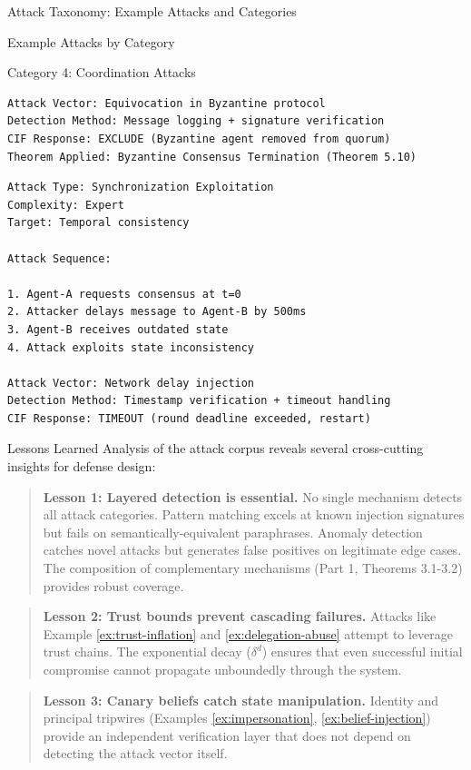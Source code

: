 \documentclass[
  ignorenonframetext,
]{beamer}
\begin{document}
\begin{frame}{Attack Taxonomy: Example Attacks and Categories}
\begin{block}{Example Attacks by Category}
\begin{block}{Category 4: Coordination Attacks}
\begin{example}
\begin{verbatim}
Attack Vector: Equivocation in Byzantine protocol
Detection Method: Message logging + signature verification
CIF Response: EXCLUDE (Byzantine agent removed from quorum)
Theorem Applied: Byzantine Consensus Termination (Theorem 5.10)
\end{verbatim}
\end{example}

\begin{example}
\label{ex:timing-attack}
\begin{verbatim}
Attack Type: Synchronization Exploitation
Complexity: Expert
Target: Temporal consistency

Attack Sequence:

1. Agent-A requests consensus at t=0
2. Attacker delays message to Agent-B by 500ms
3. Agent-B receives outdated state
4. Attack exploits state inconsistency

Attack Vector: Network delay injection
Detection Method: Timestamp verification + timeout handling
CIF Response: TIMEOUT (round deadline exceeded, restart)
\end{verbatim}
\end{example}
\end{block}
\end{block}

\begin{block}{Lessons Learned}
\protect{}\label{sec:lessons-learned}
Analysis of the attack corpus reveals several cross-cutting insights for
defense design:

\begin{quote}
\textbf{Lesson 1: Layered detection is essential.} No single mechanism
detects all attack categories. Pattern matching excels at known
injection signatures but fails on semantically-equivalent paraphrases.
Anomaly detection catches novel attacks but generates false positives on
legitimate edge cases. The composition of complementary mechanisms (Part
1, Theorems 3.1-3.2) provides robust coverage.
\end{quote}

\begin{quote}
\textbf{Lesson 2: Trust bounds prevent cascading failures.} Attacks like
Example \ref{ex:trust-inflation} and \ref{ex:delegation-abuse} attempt
to leverage trust chains. The exponential decay (\(\delta^d\)) ensures
that even successful initial compromise cannot propagate unboundedly
through the system.
\end{quote}

\begin{quote}
\textbf{Lesson 3: Canary beliefs catch state manipulation.} Identity and
principal tripwires (Examples \ref{ex:impersonation},
\ref{ex:belief-injection}) provide an independent verification layer
that does not depend on detecting the attack vector itself.
\end{quote}


\end{block}
\end{frame}
\end{document}
